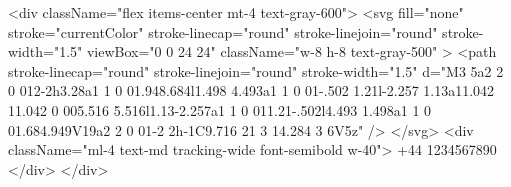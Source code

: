 {                                                <div className="flex items-center mt-4 text-gray-600">
                                                    <svg
                                                        fill="none"
                                                        stroke="currentColor"
                                                        stroke-linecap="round"
                                                        stroke-linejoin="round"
                                                        stroke-width="1.5"
                                                        viewBox="0 0 24 24"
                                                        className="w-8 h-8 text-gray-500"
                                                    >
                                                        <path
                                                            stroke-linecap="round"
                                                            stroke-linejoin="round"
                                                            stroke-width="1.5"
                                                            d="M3 5a2 2 0 012-2h3.28a1 1 0 01.948.684l1.498 4.493a1 1 0 01-.502 1.21l-2.257 1.13a11.042 11.042 0 005.516 5.516l1.13-2.257a1 1 0 011.21-.502l4.493 1.498a1 1 0 01.684.949V19a2 2 0 01-2 2h-1C9.716 21 3 14.284 3 6V5z"
                                                        />
                                                    </svg>
                                                    <div className="ml-4 text-md tracking-wide font-semibold w-40">
                                                        +44 1234567890
                                                    </div>
                                                </div>
                    
}
